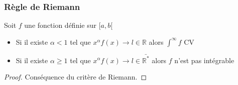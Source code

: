 \documentclass[11pt,colorlinks]{book}
\theoremstyle{mytheoremstyle}
\theoremstyle{mytheoremstyle}
\theoremstyle{mytheoremstyle}
\theoremstyle{mytheoremstyle}
\theoremstyle{mytheoremstyle}
\theoremstyle{mytheoremstyle}
\theoremstyle{mytheoremstyle}
\theoremstyle{mytheoremstyle}
\theoremstyle{myproblemstyle}
\def\mbb#1{\mathbb{#1}}
\def\bR{\mbb{R}}
\begin{document}
  \subsubsection{Règle de Riemann}
  \begin{prop}
    Soit $f$ une fonction définie sur $[a,b[$ 
    \begin{itemize}
      \item Si il existe $\alpha < 1$ tel que $x^{\alpha}f(x) \to l \in \bR$ alors $\int^{\infty} f$ CV
      \item Si il existe $\alpha \geq 1$ tel que $x^{\alpha}f(x) \to l \in \bar{\bR^{*}}$ alors $f$ n'est pas intégrable     
    \end{itemize}
    \begin{proof}
      Conséquence du critère de Riemann.
    \end{proof}
  \end{prop}
\end{document}
